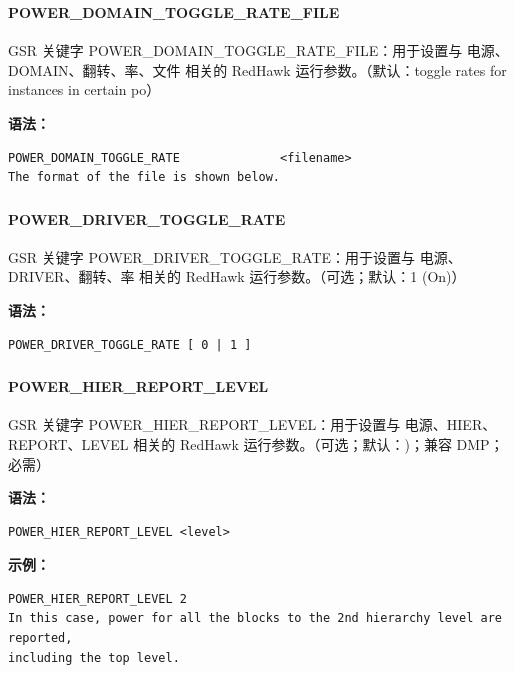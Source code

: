 \subsubsection{}
\paragraph*{POWER_DOMAIN_TOGGLE_RATE_FILE}

GSR 关键字 POWER_DOMAIN_TOGGLE_RATE_FILE：用于设置与 电源、DOMAIN、翻转、率、文件 相关的 RedHawk 运行参数。（默认：toggle rates for instances in certain po）

\textbf{语法：}
\begin{lstlisting}
POWER_DOMAIN_TOGGLE_RATE              <filename>
The format of the file is shown below.
\end{lstlisting}

\subsubsection{}
\paragraph*{POWER_DRIVER_TOGGLE_RATE}

GSR 关键字 POWER_DRIVER_TOGGLE_RATE：用于设置与 电源、DRIVER、翻转、率 相关的 RedHawk 运行参数。（可选；默认：1 (On)）

\textbf{语法：}
\begin{lstlisting}
POWER_DRIVER_TOGGLE_RATE [ 0 | 1 ]
\end{lstlisting}

\subsubsection{}
\paragraph*{POWER_HIER_REPORT_LEVEL}

GSR 关键字 POWER_HIER_REPORT_LEVEL：用于设置与 电源、HIER、REPORT、LEVEL 相关的 RedHawk 运行参数。（可选；默认：)；兼容 DMP；必需）

\textbf{语法：}
\begin{lstlisting}
POWER_HIER_REPORT_LEVEL <level>
\end{lstlisting}

\textbf{示例：}
\begin{lstlisting}
POWER_HIER_REPORT_LEVEL 2
In this case, power for all the blocks to the 2nd hierarchy level are reported,
including the top level.
\end{lstlisting}

